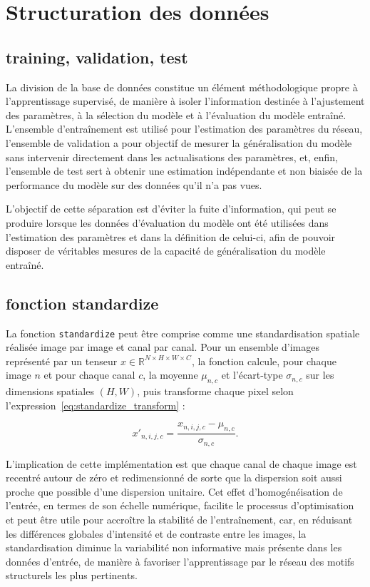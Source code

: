 

\section{Structuration des données}
\subsection{training, validation, test}
La division de la base de données constitue un élément méthodologique propre à l’apprentissage supervisé, de manière à isoler l’information destinée à l’ajustement des paramètres, à la sélection du modèle et à l’évaluation du modèle entraîné. L’ensemble d’entraînement est utilisé pour l’estimation des paramètres du réseau, l’ensemble de validation a pour objectif de mesurer la généralisation du modèle sans intervenir directement dans les actualisations des paramètres, et, enfin, l’ensemble de test sert à obtenir une estimation indépendante et non biaisée de la performance du modèle sur des données qu’il n’a pas vues.

L’objectif de cette séparation est d’éviter la fuite d’information, qui peut se produire lorsque les données d’évaluation du modèle ont été utilisées dans l’estimation des paramètres et dans la définition de celui-ci, afin de pouvoir disposer de véritables mesures de la capacité de généralisation du modèle entraîné.

\subsection{ fonction standardize}
La fonction \texttt{standardize} peut être comprise comme une standardisation spatiale réalisée image par image et canal par canal. Pour un ensemble d’images représenté par un tenseur $x\in\mathbb{R}^{N\times H\times W\times C}$, la fonction calcule, pour chaque image $n$ et pour chaque canal $c$, la moyenne $\mu_{n,c}$ et l’écart-type $\sigma_{n,c}$ sur les dimensions spatiales $(H,W)$, puis transforme chaque pixel selon l’expression~\eqref{eq:standardize_transform} :

\begin{equation}
x'_{n,i,j,c}=\frac{x_{n,i,j,c}-\mu_{n,c}}{\sigma_{n,c}}.
\label{eq:standardize_transform}
\end{equation}

L’implication de cette implémentation est que chaque canal de chaque image est recentré autour de zéro et redimensionné de sorte que la dispersion soit aussi proche que possible d’une dispersion unitaire. Cet effet d’homogénéisation de l’entrée, en termes de son échelle numérique, facilite le processus d’optimisation et peut être utile pour accroître la stabilité de l’entraînement, car, en réduisant les différences globales d’intensité et de contraste entre les images, la standardisation diminue la variabilité non informative mais présente dans les données d’entrée, de manière à favoriser l’apprentissage par le réseau des motifs structurels les plus pertinents.